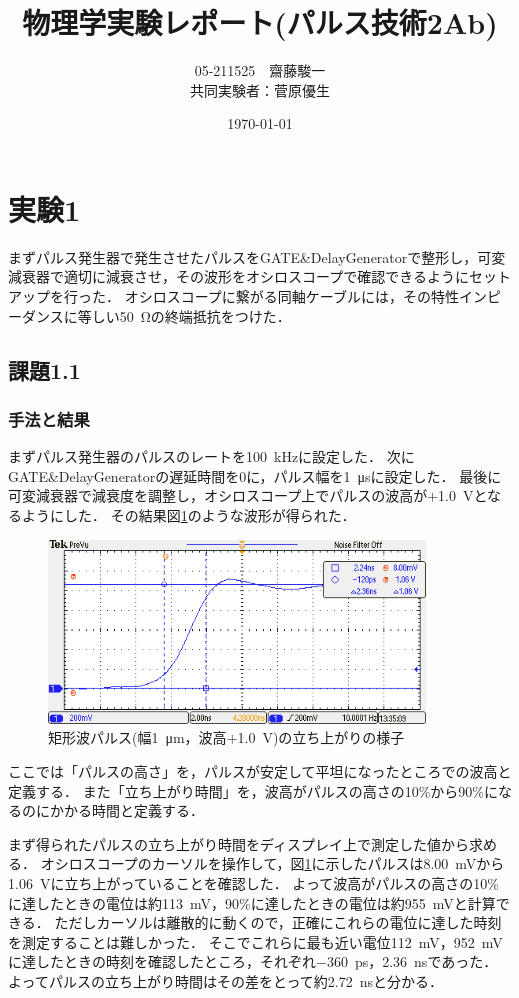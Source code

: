 \documentclass[a4paper,11pt]{jsarticle}
\begin{document}
\title{物理学実験レポート(パルス技術2Ab)}
\author{05-211525　齋藤駿一\\
共同実験者：菅原優生}
\date{\today}
\maketitle

\section{実験1}
まずパルス発生器で発生させたパルスをGATE\;\&\;Delay\;Generatorで整形し，可変減衰器で適切に減衰させ，その波形をオシロスコープで確認できるようにセットアップを行った．
オシロスコープに繋がる同軸ケーブルには，その特性インピーダンスに等しい\SI{50}{\ohm}の終端抵抗をつけた．

\subsection{課題1.1}
\subsubsection{手法と結果}
まずパルス発生器のパルスのレートを\SI{100}{\kHz}に設定した．
次にGATE\;\&\;Delay\;Generatorの遅延時間を0に，パルス幅を\SI{1}{\us}に設定した．
最後に可変減衰器で減衰度を調整し，オシロスコープ上でパルスの波高が$+$\SI{1.0}{V}となるようにした．
その結果図\ref{fig:pulserise}のような波形が得られた．

\begin{figure}[htbp]
  \centering
  \includegraphics[width=10cm]{TEK00726.png}
  \caption{矩形波パルス(幅\SI{1}{\um}，波高$+$\SI{1.0}{V})の立ち上がりの様子}
  \label{fig:pulserise}
\end{figure}

ここでは「パルスの高さ」を，パルスが安定して平坦になったところでの波高と定義する．
また「立ち上がり時間」を，波高がパルスの高さの10\%から90\%になるのにかかる時間と定義する．

まず得られたパルスの立ち上がり時間をディスプレイ上で測定した値から求める．
オシロスコープのカーソルを操作して，図\ref{fig:pulserise}に示したパルスは\SI{8.00}{\mV}から\SI{1.06}{V}に立ち上がっていることを確認した．
よって波高がパルスの高さの10\%に達したときの電位は約\SI{113}{\mV}，90\%に達したときの電位は約\SI{955}{\mV}と計算できる．
ただしカーソルは離散的に動くので，正確にこれらの電位に達した時刻を測定することは難しかった．
そこでこれらに最も近い電位\SI{112}{\mV}，\SI{952}{\mV}に達したときの時刻を確認したところ，それぞれ\SI{-360}{\ps}，\SI{2.36}{\ns}であった．
よってパルスの立ち上がり時間はその差をとって約\SI{2.72}{\ns}と分かる．
\end{document}
